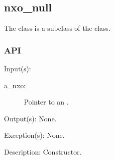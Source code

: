 %
%
%
%
%              

\subsection{nxo\_null}
\label{nxo_null}

The  class is a subclass of the  class.

\subsubsection{API}
\begin{capi}
\label{nxo_null_new}
	\begin{capilist}
	\item[Input(s): ]
		\begin{description}\item[]
		\item[a\_nxo: ]
			Pointer to an .
		\end{description}
	\item[Output(s): ] None.
	\item[Exception(s): ] None.
	\item[Description: ]
		Constructor.
	\end{capilist}
\end{capi}
